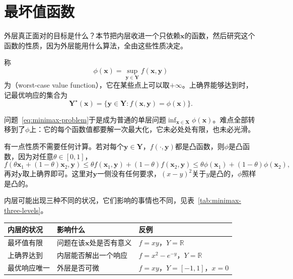 \section{最坏值函数}
\label{sec:minimax-value-function}

外层真正面对的目标是什么？本节把内层收进一个只依赖$\bm{x}$的函数，然后研究这个函数的性质，因为外层能用什么算法，全由这些性质决定。

\begin{definition}[最坏值函数]
\label{def:minimax-value}
称
\begin{equation}
 \phi(\bm{x})=\sup_{\bm{y}\in\bm{Y}}f(\bm{x},\bm{y})
 \label{eq:minimax-value}
\end{equation}
为（worst-case value function），它在某些点上可以取$+\infty$。上确界能够达到时，记最优响应的集合为
\begin{equation}
 \bm{Y}^\star(\bm{x})=\{\bm{y}\in\bm{Y}:f(\bm{x},\bm{y})=\phi(\bm{x})\}.
 \label{eq:minimax-response-set}
\end{equation}
\end{definition}

问题~\eqref{eq:minimax-problem}于是成为普通的单层问题$\inf_{\bm{x}\in\bm{X}}\phi(\bm{x})$。难点全部转移到了$\phi$上：它的每个函数值都要解一次最大化，它未必处处有限，也未必光滑。

有一点性质不需要任何计算。若对每个$\bm{y}\in\bm{Y}$，$f(\cdot,\bm{y})$都是凸函数，则$\phi$是凸函数，因为对任意$\theta\in[0,1]$，
\[
 f(\theta\bm{x}_1+(1-\theta)\bm{x}_2,\bm{y})\leq\theta f(\bm{x}_1,\bm{y})+(1-\theta)f(\bm{x}_2,\bm{y})\leq\theta\phi(\bm{x}_1)+(1-\theta)\phi(\bm{x}_2),
\]
再对$\bm{y}$取上确界即可。这里对$\bm{y}$一侧没有任何要求，$(x-y)^2$关于$y$是凸的，$\phi$照样是凸的。

内层可能出现三种不同的状况，它们影响的事情也不同，见表~\ref{tab:minimax-three-levels}。

\begin{BookInlineTable}
 \centering
 \begin{tabular}{@{}lll@{}}
  \toprule
  内层的状况 & 影响什么 & 反例\\
  \midrule
  最坏值有限 & 问题在该$\bm{x}$处是否有意义 & $f=xy$，$Y=\mathbb{R}$\\
  上确界达到 & 内层能否解出一个响应 & $f=x^2-e^{-y}$，$Y=\mathbb{R}$\\
  最优响应唯一 & 外层是否可微 & $f=xy$，$Y=[-1,1]$，$x=0$\\
  \bottomrule
 \end{tabular}
 \caption{内层的三种状况及其影响。反例说明相应性质可能失败。}
 \label{tab:minimax-three-levels}
\end{BookInlineTable}


